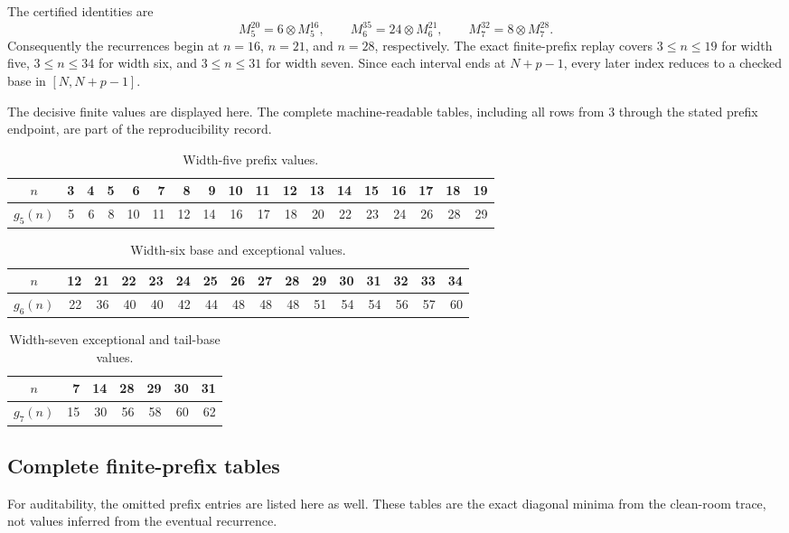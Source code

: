 \documentclass[11pt]{article}
\theoremstyle{definition}
\begin{document}
The certified identities are
\[
M_5^{20}=6\otimes M_5^{16},\qquad
M_6^{35}=24\otimes M_6^{21},\qquad
M_7^{32}=8\otimes M_7^{28}.
\]
Consequently the recurrences begin at \(n=16\), \(n=21\), and \(n=28\),
respectively. The exact finite-prefix replay covers \(3\leq n\leq19\) for
width five, \(3\leq n\leq34\) for width six, and \(3\leq n\leq31\) for
width seven. Since each interval ends at \(N+p-1\), every later index
reduces to a checked base in \([N,N+p-1]\).

The decisive finite values are displayed here. The complete machine-readable
tables, including all rows from \(3\) through the stated prefix endpoint,
are part of the reproducibility record.

\begin{table}[ht]
\centering
\caption{Width-five prefix values.}\label{tab:w5prefix}
\begin{tabular}{c|rrrrrrrrrrrrrrrrr}
\toprule
\(n\)&3&4&5&6&7&8&9&10&11&12&13&14&15&16&17&18&19\\
\midrule
\(g_5(n)\)&5&6&8&10&11&12&14&16&17&18&20&22&23&24&26&28&29\\
\bottomrule
\end{tabular}
\end{table}

\begin{table}[ht]
\centering
\caption{Width-six base and exceptional values.}\label{tab:w6prefix}
\begin{tabular}{c|rrrrrrrrrrrrrrr}
\toprule
\(n\)&12&21&22&23&24&25&26&27&28&29&30&31&32&33&34\\
\midrule
\(g_6(n)\)&22&36&40&40&42&44&48&48&48&51&54&54&56&57&60\\
\bottomrule
\end{tabular}
\end{table}

\begin{table}[ht]
\centering
\caption{Width-seven exceptional and tail-base values.}\label{tab:w7prefix}
\begin{tabular}{c|rrrrrr}
\toprule
\(n\)&7&14&28&29&30&31\\
\midrule
\(g_7(n)\)&15&30&56&58&60&62\\
\bottomrule
\end{tabular}
\end{table}

\subsection*{Complete finite-prefix tables}
For auditability, the omitted prefix entries are listed here as well. These
tables are the exact diagonal minima from the clean-room trace, not values
inferred from the eventual recurrence.
\end{document}
